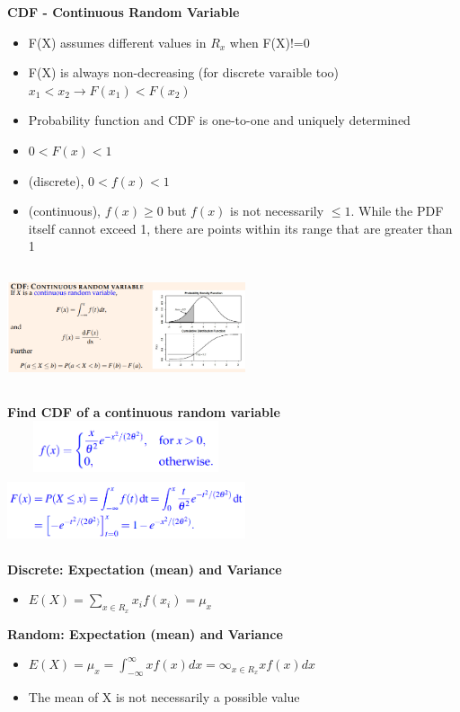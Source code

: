\documentclass[10pt, landscape]{article}
\begin{document}
\begin{multicols}{4}
\textbf{CDF - Continuous Random Variable} 
\begin{itemize}
  \item F(X) assumes different values in $R_x$ when F(X)!=0 
  \item F(X) is always non-decreasing (for discrete varaible too) $x_1<x_2 \rightarrow F(x_1)<F(x_2)$
  \item Probability function and CDF is one-to-one and uniquely determined
  \item $0<F(x)<1$ 
  \item (discrete), $0<f(x)<1$
  \item (continuous), $f(x) \ge 0$ but $f(x)$ is not necessarily $\le 1$. While the PDF itself cannot exceed 1, there are points within its range that are greater than 1
\end{itemize}
\includegraphics[width=7cm, height=3.5cm]{cdf_random.png}

\textbf{Find CDF of a continuous random variable} \newline
\includegraphics[width=7cm, height=1.5cm]{p2.png}
\includegraphics[width=7cm, height=2cm]{p1.png}

\textbf{Discrete: Expectation (mean) and Variance}
\begin{itemize}
  \item $E(X)=\sum_{x \in R_x}x_if(x_i)=\mu_x$
\end{itemize}

\textbf{Random: Expectation (mean) and Variance}
\begin{itemize}
  \item $E(X)=\mu_x=\int_{-\infty}^{\infty}xf(x)dx= \infty_{x \in R_x}xf(x)dx$
  \item The mean of X is not necessarily a possible value
\end{itemize}


\end{multicols}
\end{document}
